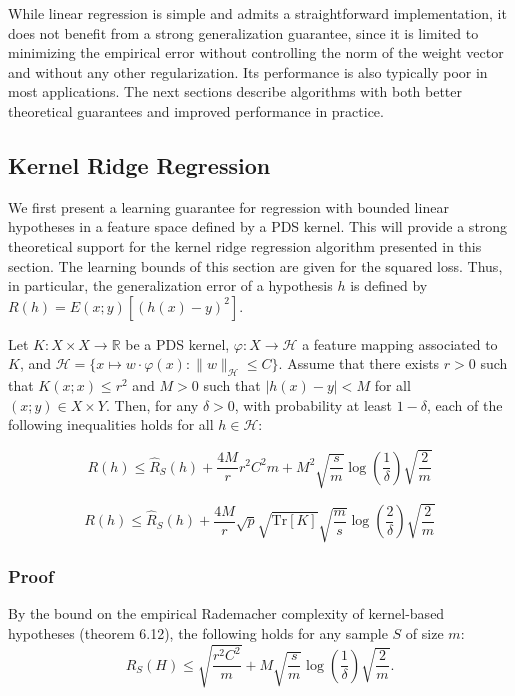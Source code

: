 \documentclass[fleqn,10pt]{olplainarticle}
\begin{document}
While linear regression is simple and admits a straightforward implementation, it does not benefit from a strong generalization guarantee, since it is limited to minimizing the empirical error without controlling the norm of the weight vector and without any other regularization. Its performance is also typically poor in most applications. The next sections describe algorithms with both better theoretical guarantees and improved performance in practice.

\subsection{Kernel Ridge Regression}

We first present a learning guarantee for regression with bounded linear hypotheses in a feature space defined by a PDS kernel. This will provide a strong theoretical support for the kernel ridge regression algorithm presented in this section. The learning bounds of this section are given for the squared loss. Thus, in particular, the generalization error of a hypothesis $h$ is defined by $R(h) = E(x;y) \left[ (h(x) - y)^2 \right]$.


Let $K: X \times X \rightarrow \mathbb{R}$ be a PDS kernel, $\varphi: X \rightarrow \mathcal{H}$ a feature mapping associated to $K$, and $\mathcal{H} = \{ x \mapsto w \cdot \varphi(x) : \|w\|_{\mathcal{H}} \leq C \}$. Assume that there exists $r > 0$ such that $K(x; x) \leq r^2$ and $M > 0$ such that $|h(x) - y| < M$ for all $(x; y) \in X \times Y$. Then, for any $\delta > 0$, with probability at least $1 - \delta$, each of the following inequalities holds for all $h \in \mathcal{H}$:

\[
R(h) \leq \hat{R}_S(h) + \frac{4M}{r} r^2C^2 m + M^2 \sqrt{\frac{s}{m}} \log\left(\frac{1}{\delta}\right) \sqrt{\frac{2}{m}}
\]

\[
R(h) \leq \hat{R}_S(h) + \frac{4M}{r} \sqrt{p} \sqrt{\text{Tr}[K]} \sqrt{\frac{m}{s}} \log\left(\frac{2}{\delta}\right) \sqrt{\frac{2}{m}}
\]


\subsubsection{Proof}

By the bound on the empirical Rademacher complexity of kernel-based hypotheses (theorem 6.12), the following holds for any sample $S$ of size $m$:
\[
\hat{R}_S(H) \leq \sqrt{\frac{r^2C^2}{m}} + M \sqrt{\frac{s}{m}} \log\left(\frac{1}{\delta}\right) \sqrt{\frac{2}{m}}.
\]
\end{document}
